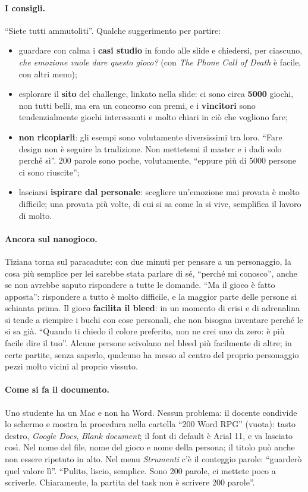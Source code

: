 \paragraph{I consigli.} ``Siete tutti ammutoliti''. Qualche suggerimento per partire:
\begin{itemize}
  \item guardare con calma i \textbf{casi studio} in fondo alle slide e chiedersi,
        per ciascuno, \emph{che emozione vuole dare questo gioco?} (con \emph{The
        Phone Call of Death} è facile, con altri meno);
  \item esplorare il \textbf{sito} del challenge, linkato nella slide: ci sono circa
        \textbf{5000} giochi, non tutti belli, ma era un concorso con premi, e i
        \textbf{vincitori} sono tendenzialmente giochi interessanti e molto chiari in
        ciò che vogliono fare;
  \item \textbf{non ricopiarli}: gli esempi sono volutamente diversissimi tra loro.
        ``Fare design non è seguire la tradizione. Non mettetemi il master e i dadi
        solo perché sì''. 200 parole sono poche, volutamente, ``eppure più di 5000
        persone ci sono riuscite'';
  \item lasciarsi \textbf{ispirare dal personale}: scegliere un'emozione mai provata
        è molto difficile; una provata più volte, di cui si sa come la si vive,
        semplifica il lavoro di molto.
\end{itemize}

\paragraph{Ancora sul nanogioco.} Tiziana torna sul paracadute: con due minuti per
pensare a un personaggio, la cosa più semplice per lei sarebbe stata parlare di sé,
``perché mi conosco'', anche se non avrebbe saputo rispondere a tutte le domande.
``Ma il gioco è fatto apposta'': rispondere a tutto è molto difficile, e la maggior
parte delle persone si schianta prima. Il gioco \textbf{facilita il bleed}: in un
momento di crisi e di adrenalina si tende a riempire i buchi con cose personali, che
non bisogna inventare perché le si sa già. ``Quando ti chiedo il colore preferito, non
ne crei uno da zero: è più facile dire il tuo''. Alcune persone scivolano nel bleed
più facilmente di altre; in certe partite, senza saperlo, qualcuno ha messo al centro
del proprio personaggio pezzi molto vicini al proprio vissuto.

\paragraph{Come si fa il documento.} Uno studente ha un Mac e non ha Word. Nessun
problema: il docente condivide lo schermo e mostra la procedura nella cartella
``200 Word RPG'' (vuota): tasto destro, \emph{Google Docs}, \emph{Blank document};
il font di default è Arial 11, e va lasciato così. Nel nome del file, nome del gioco e
nome della persona; il titolo può anche non essere ripetuto in alto. Nel menu
\emph{Strumenti} c'è il conteggio parole: ``guarderò quel valore lì''. ``Pulito,
liscio, semplice. Sono 200 parole, ci mettete poco a scriverle. Chiaramente, la
partita del task non è scrivere 200 parole''.

